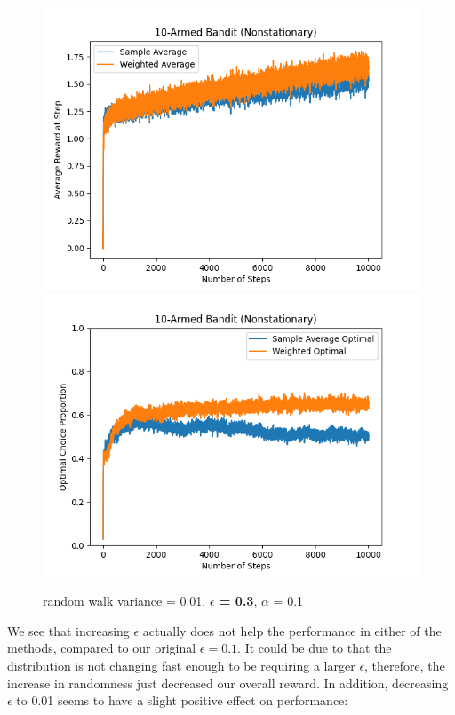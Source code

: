 \documentclass{article}
\begin{document}
\begin{figure}[h!]
\centering
\includegraphics[scale=.6]{RL_A1_pics/epsilon/0.3.png}
\includegraphics[scale=.6]{RL_A1_pics/epsilon/optimal/0.3.png}
\caption{random walk variance = 0.01, \textbf{$\epsilon$ = 0.3}, $\alpha$ = 0.1}
\label{fig:10-Armed1}
\end{figure}

\newpage
We see that increasing $\epsilon$ actually does not help the performance in either of the methods, compared to our original $\epsilon = 0.1$. It could be due to that the distribution is not changing fast enough to be requiring a larger $\epsilon$, therefore, the increase in randomness just decreased our overall reward. In addition, decreasing $\epsilon$ to 0.01 seems to have a slight positive effect on performance:
\end{document}
